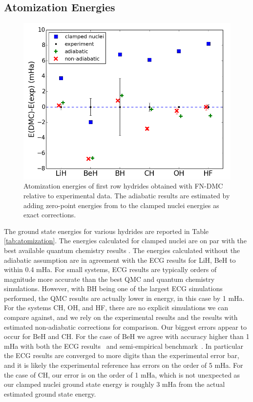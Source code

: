 \documentclass[pra,superscriptaddress,groupedaddress,twocolumn]{revtex4}
\begin{document}


\subsection{Atomization Energies}

\begin{figure}
\centering
\includegraphics[scale=.4]{Figures/atomization}
\caption{Atomization energies of first row hydrides obtained with FN-DMC relative to experimental data. The adiabatic results are estimated by adding zero-point energies from \cite{Feller_Corrections} to the clamped nuclei energies as exact corrections.}
\end{figure}

The ground state energies for various hydrides are reported in Table \ref{tab:atomization}. The energies calculated for clamped nuclei are on par with the best available quantum chemistry results \cite{Adamowicz_LiH,Koput_BeH,Miliordos_BH}. The energies calculated without the adiabatic assumption are in agreement with the ECG results for LiH, BeH to within 0.4 mHa. For small systems, ECG results are typically orders of magnitude more accurate than the best QMC and quantum chemistry simulations. However, with BH being one of the largest ECG simulations performed, the QMC results are actually lower in energy, in this case by 1 mHa. For the systems CH, OH, and HF, there are no explicit simulations we can compare against, and we rely on the experimental results and the results with estimated non-adiabatic corrections for comparison. Our biggest errors appear to occur for BeH and CH. For the case of BeH we agree with accuracy higher than 1 mHa with both the ECG results~\cite{Bubin_BeH_noBO} and semi-empirical benchmark~\cite{Feller_Corrections,Davidson_Atoms}. In particular the ECG results are converged to more digits than the experimental error bar, and it is likely the experimental reference has errors on the order of 5 mHa. For the case of CH, our error is on the order of 1 mHa, which is not unexpected as our clamped nuclei ground state energy is roughly 3 mHa from the actual estimated ground state energy.
\end{document}

